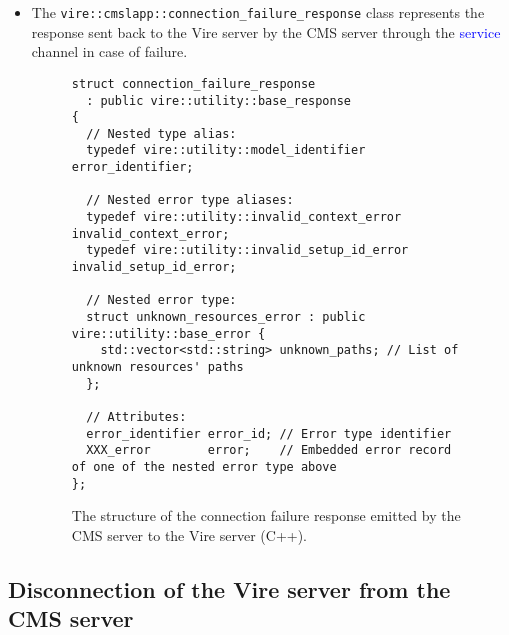 \begin{itemize}
\item
The  \texttt{vire::cmslapp::connection\_failure\_response}  class
represents the response sent back to the Vire server by the CMS server
through the \textcolor{blue}{service} channel in case of failure.

\begin{center}
\end{center}

\begin{figure}[h]
\vskip 10pt
\small
\begin{Verbatim}[frame=single,xleftmargin=0.cm,label=\fbox{C++}]
struct connection_failure_response
  : public vire::utility::base_response
{
  // Nested type alias:
  typedef vire::utility::model_identifier error_identifier;

  // Nested error type aliases:
  typedef vire::utility::invalid_context_error invalid_context_error;
  typedef vire::utility::invalid_setup_id_error invalid_setup_id_error;

  // Nested error type:
  struct unknown_resources_error : public vire::utility::base_error {
    std::vector<std::string> unknown_paths; // List of unknown resources' paths
  };

  // Attributes:
  error_identifier error_id; // Error type identifier
  XXX_error        error;    // Embedded error record of one of the nested error type above
};
\end{Verbatim}
\normalsize
\caption{The structure  of the  connection failure response emitted
  by the CMS server to the Vire server (C++).}
\label{fig-app-payload-connection_failure_response}
\end{figure}


\end{itemize}


\vfill
\pagebreak
\clearpage


\subsection{Disconnection of the Vire server from the CMS server}

